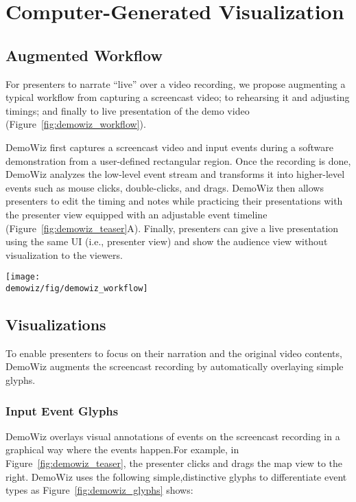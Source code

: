 \section{Computer-Generated Visualization}

\subsection{Augmented Workflow}
For presenters to narrate ``live'' over a video recording, we propose augmenting a typical workflow from capturing a screencast video; to rehearsing it and adjusting timings; and finally to live presentation of the demo video (Figure~\ref{fig:demowiz_workflow}).

DemoWiz first captures a screencast video and input events during a software demonstration from a user-defined rectangular region. Once the recording is done, DemoWiz analyzes the low-level event stream and transforms it into higher-level events such as mouse clicks, double-clicks, and drags. DemoWiz then allows presenters to edit the timing and notes while practicing their presentations with the presenter view equipped with an adjustable event timeline (Figure~\ref{fig:demowiz_teaser}A). Finally, presenters can give a live presentation using the same UI (i.e., presenter view) and show the audience view without visualization to the viewers.

\begin{figure*}[t]
  \centering
  \texttt{[image: \\demowiz/fig/demowiz\_workflow]}
  \caption{DemoWiz workflow: Presenters captures a software demonstration, edit the video recording while rehearsing with our playback UI, and present the edited video to the audience using a presenter view.}
  \label{fig:demowiz_workflow}
\end{figure*}


\subsection{Visualizations}
To enable presenters to focus on their narration and the original video contents, DemoWiz augments the screencast recording by automatically overlaying simple glyphs.

\subsubsection{Input Event Glyphs}
DemoWiz overlays visual annotations of events on the screencast recording in a graphical way where the events happen.For example, in Figure~\ref{fig:demowiz_teaser}, the presenter clicks and drags the map view to the right. DemoWiz uses the following simple,distinctive glyphs to differentiate event types as Figure~\ref{fig:demowiz_glyphs} shows:

